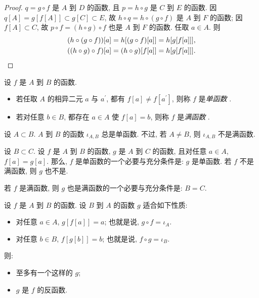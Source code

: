 \begin{proof}
    $q = g \circ f$ 是 $A$ 到 $D$ 的函数,
    且 $p = h \circ g$ 是 $C$ 到 $E$ 的函数.
    因 $q[A] = g[f[A]] \subset g[C] \subset E$,
    故 $h \circ q = h \circ (g \circ f)$
    是 $A$ 到 $F$ 的函数;
    因 $f[A] \subset C$,
    故 $p \circ f = (h \circ g) \circ f$
    也是 $A$ 到 $F$ 的函数.
    任取 $a \in A$. 则
    \begin{align*}
         & (h \circ (g \circ f))[a]
        = h[(g \circ f)[a]]
        = h[g[f[a]]],               \\
         & ((h \circ g) \circ f)[a]
        = (h \circ g)[f[a]]
        = h[g[f[a]]]. \qedhere
    \end{align*}
\end{proof}

\begin{definition}
    设 $f$ 是 $A$ 到 $B$ 的函数.
    \begin{itemize}
        \item 若任取 $A$ 的相异二元 $a$ 与 $a^{\prime}$,
              都有 $f[a] \neq f[a^{\prime}]$,
              则称 $f$ 是\emph{单函数}%
              .
        \item 若对任意 $b \in B$,
              都存在 $a \in A$ 使 $f[a] = b$,
              则称 $f$ 是\emph{满函数}%
              .
    \end{itemize}
\end{definition}

\begin{example}
    设 $A \subset B$.
    $A$ 到 $B$ 的函数 $\iota_{A,B}$ 总是单函数.
    不过, 若 $A \neq B$, 则 $\iota_{A,B}$ 不是满函数.
\end{example}

\begin{remark}
    设 $B \subset C$.
    设 $f$ 是 $A$ 到 $B$ 的函数,
    $g$ 是 $A$ 到 $C$ 的函数,
    且对任意 $a \in A$, $f[a] = g[a]$.
    那么, $f$ 是单函数的一个必要与充分条件是:
    $g$ 是单函数.
    若 $f$ 不是满函数, 则 $g$ 也不是.

    若 $f$ 是满函数,
    则 $g$ 也是满函数的一个必要与充分条件是:
    $B = C$.
\end{remark}

\begin{theorem}
    设 $f$ 是 $A$ 到 $B$ 的函数.
    设 $B$ 到 $A$ 的函数 $g$ 适合如下性质:
    \begin{itemize}
        \item 对任意 $a \in A$, $g[f[a]] = a$;
              也就是说, $g \circ f = \iota_A$.
        \item 对任意 $b \in B$, $f[g[b]] = b$;
              也就是说, $f \circ g = \iota_B$.
    \end{itemize}
    则:
    \begin{itemize}
        \item 至多有一个这样的 $g$;
        \item $g$ 是 $f$ 的反函数.
    \end{itemize}
\end{theorem}

